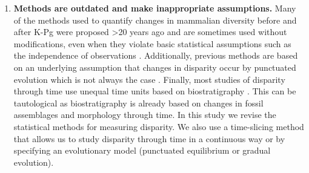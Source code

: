 \documentclass[12pt,letterpaper]{article}
\begin{document}
\begin{enumerate}
    \item \textbf{Methods are outdated and make inappropriate assumptions.}
    Many of the methods used to quantify changes in mammalian diversity before and after K-Pg were proposed \textgreater 20 years ago \citep{Foote01071994,Wills1994} and are sometimes used without modifications, even when they violate basic statistical assumptions such as the independence of observations
    \citep[e.g.,][]{brusatte50,Brusatte12092008,cisneros2010,thorneresetting2011,prentice2011,brusattedinosaur2012,toljagictriassic-jurassic2013,ruta2013,bentonmodels2014,bensonfaunal2014}.
    Additionally, previous methods are based on an underlying assumption that changes in disparity occur by punctuated evolution \citep[e.g.][]{Wesley-Hunt2005} which is not always the case \citep{Hunt21042015}.
    Finally, most studies of disparity through time use unequal time units based on biostratigraphy \citep{Brusatte12092008,brusattedinosaur2012,toljagictriassic-jurassic2013}. 
    This can be tautological as biostratigraphy is already based on changes in fossil assemblages and morphology through time.
    In this study we revise the statistical methods for measuring disparity.
    We also use a time-slicing method that allows us to study disparity through time in a continuous way or by specifying an evolutionary model (punctuated equilibrium or gradual evolution).
  \end{enumerate}
\end{document}
